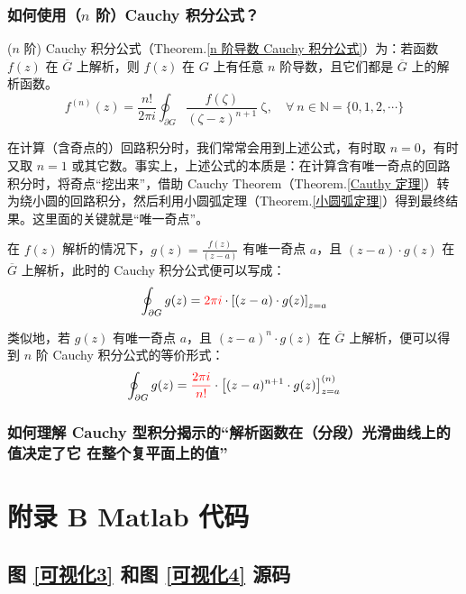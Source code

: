 \documentclass[UTF8]{report}
\def\N{\mathbb{N}}
\theoremstyle{MyLineTheoremStyle} %
\theoremstyle{MyBlockTheoremStyle} %
\theoremstyle{MySubsubsectionStyle} %
\begin{document}
\subsection{如何使用（$n$ 阶）Cauchy 积分公式？}

($n$ 阶) Cauchy 积分公式（Theorem.\ref{n 阶导数 Cauchy 积分公式}）为：若函数 $f(z)$ 在 $\overline{G}$ 上解析，则 $f(z)$ 在 $G$ 上有任意 $n$ 阶导数，且它们都是 $\overline{G}$ 上的解析函数。
\begin{equation}
f^{(n)}(z) = \frac{n !}{2\pi i} \oint_{\partial G} \frac{f(\zeta)}{(\zeta - z )^{n+1}} \ \mathrm{\zeta},\quad \forall\ n \in \N = \{0, 1, 2, \cdots\}
\end{equation}

在计算（含奇点的）回路积分时，我们常常会用到上述公式，有时取 $n = 0$，有时又取 $n =1$ 或其它数。事实上，上述公式的本质是：在计算含有唯一奇点的回路积分时，将奇点“挖出来”，借助 Cauchy Theorem（Theorem.\ref{Cauthy 定理}）转为绕小圆的回路积分，然后利用小圆弧定理（Theorem.\ref{小圆弧定理}）得到最终结果。这里面的关键就是“唯一奇点”。

在 $f(z)$ 解析的情况下，$g(z) = \frac{f(z)}{(z - a)}$ 有唯一奇点 $a$，且 $(z - a)\cdot g(z) $ 在 $\overline{G}$ 上解析，此时的 Cauchy 积分公式便可以写成：
\begin{equation}
\oint_{\partial G} g(z) = {\color{red} 2\pi i }\cdot \left[ (z - a)\cdot g(z) \right]_{z = a}
\end{equation}

类似地，若 $g(z)$ 有唯一奇点 $a$，且 $(z - a)^n\cdot g(z) $ 在 $\overline{G}$ 上解析，便可以得到 $n$ 阶 Cauchy 积分公式的等价形式：
\begin{equation}
    \oint_{\partial G} g(z) = {\color{red} \frac{2\pi i}{n!}} \cdot \left[ (z - a)^{n+1}\cdot g(z) \right]^{(n)}_{z = a}
\end{equation}

\subsection{如何理解 Cauchy 型积分揭示的“解析函数在（分段）光滑曲线上的值决定了它 在整个复平面上的值”}

\chapter*{附录 B\hspace*{20pt}  Matlab 代码}
\thispagestyle{fancy}
\setcounter{chapter}{21}   %
\setcounter{section}{0}   
\renewcommand\thesection{B.\arabic{section}}   
\renewcommand{\thefigure}{B.\arabic{figure}} 
\renewcommand{\thetable}{B.\arabic{table}}

\section{图 \ref{可视化3} 和图 \ref{可视化4} 源码}
\label{可视化34 源码}


\end{document}
